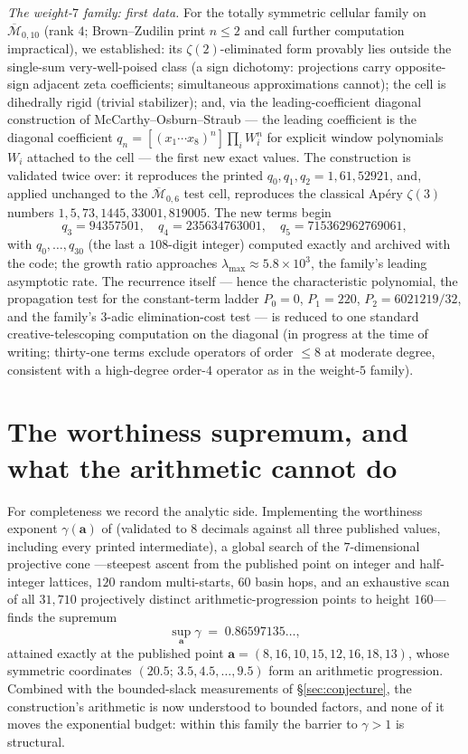 \documentclass[11pt]{article}
\theoremstyle{definition}
\begin{document}
\emph{The weight-$7$ family: first data.} For the totally symmetric
cellular family on $\overline{\mathcal M}_{0,10}$ (rank $4$;
Brown--Zudilin print $n\le2$ and call further computation
impractical), we established: its $\zeta(2)$-eliminated form provably
lies outside the single-sum very-well-poised class (a sign dichotomy:
projections carry opposite-sign adjacent zeta coefficients;
simultaneous approximations cannot); the cell is dihedrally rigid
(trivial stabilizer); and, via the leading-coefficient diagonal
construction of McCarthy--Osburn--Straub \cite{MOS} --- the leading
coefficient is the diagonal coefficient
$q_n=[(x_1\cdots x_8)^n]\prod_i W_i^n$ for explicit window polynomials
$W_i$ attached to the cell --- the first new exact values. The
construction is validated twice over: it reproduces the printed
$q_0,q_1,q_2 = 1, 61, 52921$, and, applied unchanged to the
$\overline{\mathcal M}_{0,6}$ test cell, reproduces the classical
Ap\'ery $\zeta(3)$ numbers $1,5,73,1445,33001,819005$. The new terms
begin
\[
q_3 = 94357501,\quad q_4 = 235634763001,\quad q_5 = 715362962769061,
\]
with $q_0,\dots,q_{30}$ (the last a $108$-digit integer) computed
exactly and archived with the code; the growth ratio approaches
$\lambda_{\max}\approx5.8\times10^{3}$, the family's leading
asymptotic rate. The recurrence itself --- hence the characteristic
polynomial, the propagation test for the constant-term ladder
$P_0=0$, $P_1=220$, $P_2=6021219/32$, and the family's $3$-adic
elimination-cost test --- is reduced to one standard
creative-telescoping computation on the diagonal (in progress at the
time of writing; thirty-one terms exclude operators of order
$\le8$ at moderate degree, consistent with a high-degree
order-$4$ operator as in the weight-$5$ family).

\section{The worthiness supremum, and what the arithmetic cannot do}
\label{sec:gamma}

For completeness we record the analytic side. Implementing the
worthiness exponent $\gamma(\mathbf a)$ of \cite{BZ} (validated to $8$
decimals against all three published values, including every printed
intermediate), a global search of the $7$-dimensional projective cone
---steepest ascent from the published point on integer and half-integer
lattices, $120$ random multi-starts, $60$ basin hops, and an exhaustive
scan of all $31{,}710$ projectively distinct arithmetic-progression
points to height $160$---finds the supremum
\[
\sup_{\mathbf a}\gamma \;=\; 0.86597135\ldots,
\]
attained exactly at the published point $\mathbf a=(8,16,10,15,12,16,18,13)$,
whose symmetric coordinates $(20.5;\,3.5,4.5,\dots,9.5)$ form an
arithmetic progression. Combined with the bounded-slack measurements of
\S\ref{sec:conjecture}, the construction's arithmetic is now understood
to bounded factors, and none of it moves the exponential budget: within
this family the barrier to $\gamma>1$ is structural.
\end{document}
